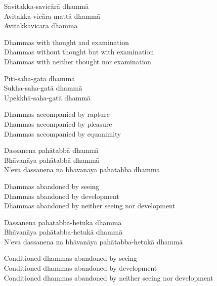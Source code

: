 \begin{pali-hang-continued}
  Savitakka-savicārā dhammā\\
  Avitakka-vicāra-mattā dhammā\\
  Avitakkāvicārā dhammā
\end{pali-hang-continued}

\begin{english-verses}
  Dhammas with thought and examination\\
  Dhammas without thought but with examination\\
  Dhammas with neither thought nor examination
\end{english-verses}

\begin{pali-hang-continued}
  Pīti-saha-gatā dhammā\\
  Sukha-saha-gatā dhammā\\
  Upekkhā-saha-gatā dhammā
\end{pali-hang-continued}

\begin{english-verses}
  Dhammas accompanied by rapture\\
  Dhammas accompanied by pleasure\\
  Dhammas accompanied by equanimity
\end{english-verses}

\begin{pali-hang-continued}
  Dassanena pahātabbā dhammā\\
  Bhāvanāya pahātabbā dhammā\\
  N'eva dassanena na bhāvanāya pahātabbā dhammā
\end{pali-hang-continued}

\begin{english-verses}
  Dhammas abandoned by seeing\\
  Dhammas abandoned by development\\
  Dhammas abandoned by neither seeing nor development
\end{english-verses}

\begin{pali-hang-continued}
  Dassanena pahātabba-hetukā dhammā\\
  Bhāvanāya pahātabba-hetukā dhammā\\
  N'eva dassanena na bhāvanāya pahātabba-hetukā dhammā
\end{pali-hang-continued}

\begin{english-verses}
  Conditioned dhammas abandoned by seeing\\
  Conditioned dhammas abandoned by development\\
  Conditioned dhammas abandoned by neither seeing nor development
\end{english-verses}

